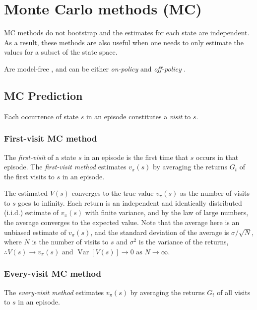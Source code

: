 \section{Monte Carlo methods (MC)}

MC methods do not bootstrap  and the estimates for each state are independent.
As a result, these methods are also useful when one needs to only estimate the values for a subset of the state space.

Are model-free , and can be either \textit{on-policy} and \textit{off-policy} .

\subsection{MC Prediction}

Each occurrence of state \( s \) in an episode constitutes a \textit{visit} to \( s \).

\subsubsection{First-visit MC method}

The \textit{first-visit} of a state \( s \) in an episode is the first time that \( s \) occurs in that episode.
The \textit{first-visit method} estimates \( v_\pi(s) \) by averaging the returns \( G_t \) of the first visits to \( s \) in an episode.

The estimated \( V(s) \) converges to the true value \( v_\pi(s) \) as the number of visits to \( s \) goes to infinity.
Each return is an independent and identically distributed (i.i.d.) estimate of \( v_\pi(s) \) with finite variance, and by the law of large numbers, the average converges to the expected value.
Note that the average here is an unbiased estimate of \( v_\pi(s) \), and the standard deviation of the average is \( \sigma / \sqrt{N} \), where \( N \) is the number of visits to \( s \) and \( \sigma^2 \) is the variance of the returns, \( \therefore V(s) \to v_\pi(s) \text{ and } \operatorname{Var}[V(s)] \to 0 \text{ as } N \to \infty \).

\subsubsection{Every-visit MC method}

The \textit{every-visit method} estimates \( v_\pi(s) \) by averaging the returns \( G_t \) of all visits to \( s \) in an episode.

